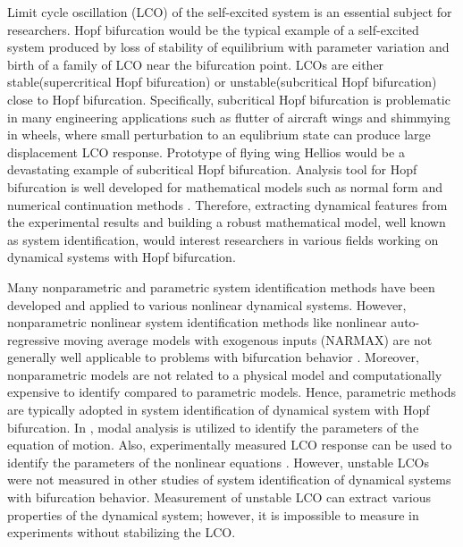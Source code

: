 \documentclass[openacc]{rsproca_new}%
\begin{document}
Limit cycle oscillation (LCO) of the self-excited system is an essential subject for researchers. Hopf bifurcation would be the typical example of a self-excited system produced by loss of stability of equilibrium with parameter variation and birth of a family of LCO near the bifurcation point. LCOs are either stable(supercritical Hopf bifurcation) or unstable(subcritical Hopf bifurcation) close to Hopf bifurcation. Specifically, subcritical Hopf bifurcation is problematic in many engineering applications such as flutter of aircraft wings and shimmying in wheels, where small perturbation to an equlibrium state can produce large displacement LCO response. Prototype of flying wing Hellios \cite{noll2004investigation} would be a devastating example of subcritical Hopf bifurcation. Analysis tool for Hopf bifurcation is well developed for mathematical models such as normal form \cite{yu2002simplest,ashwin1995numerical} and numerical  continuation methods \cite{doedel2000auto2000,dankowicz2013recipes}. Therefore, extracting dynamical features from the experimental results and building a robust mathematical model, well known as system identification, would interest researchers in various fields working on dynamical systems with Hopf bifurcation.

Many nonparametric and parametric system identification methods have been developed and applied to various nonlinear dynamical systems. However, nonparametric nonlinear system identification methods like nonlinear auto-regressive moving average models with exogenous inputs (NARMAX) are not generally well applicable to problems with bifurcation behavior \cite{thothadri2005nonlinear}. Moreover, nonparametric models are not related to a physical model and computationally expensive to identify compared to parametric models. Hence, parametric methods are typically adopted in system identification of dynamical system with Hopf bifurcation. In \cite{fichera2014experimental}, modal analysis is utilized to identify the parameters of the equation of motion. Also, experimentally measured LCO response can be used to identify the parameters of the nonlinear equations \cite{abdelkefi2013analytical}. However, unstable LCOs were not measured in other studies of system identification of dynamical systems with bifurcation behavior. Measurement of unstable LCO can extract various properties of the dynamical system; however, it is impossible to measure in experiments without stabilizing the LCO.
\end{document}
